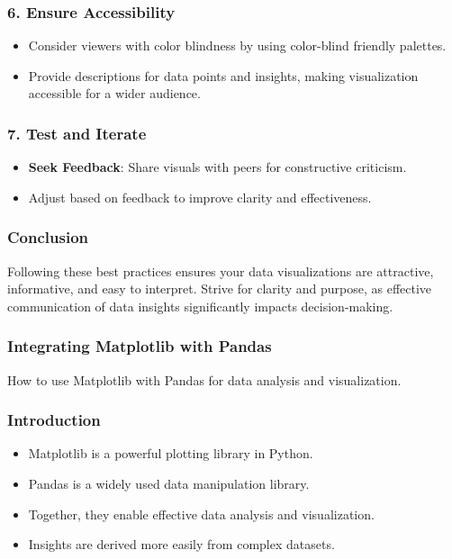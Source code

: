 \documentclass{beamer}
\begin{document}
\begin{frame}[fragile]
    \frametitle{6. Ensure Accessibility}
    \begin{itemize}
        \item Consider viewers with color blindness by using color-blind friendly palettes.
        \item Provide descriptions for data points and insights, making visualization accessible for a wider audience.
    \end{itemize}
\end{frame}

\begin{frame}[fragile]
    \frametitle{7. Test and Iterate}
    \begin{itemize}
        \item \textbf{Seek Feedback}: Share visuals with peers for constructive criticism.
        \item Adjust based on feedback to improve clarity and effectiveness.
    \end{itemize}
\end{frame}

\begin{frame}[fragile]
    \frametitle{Conclusion}
    Following these best practices ensures your data visualizations are attractive, informative, and easy to interpret. Strive for clarity and purpose, as effective communication of data insights significantly impacts decision-making.
\end{frame}

\begin{frame}
    \frametitle{Integrating Matplotlib with Pandas}
    How to use Matplotlib with Pandas for data analysis and visualization.
\end{frame}

\begin{frame}
    \frametitle{Introduction}
    \begin{itemize}
        \item Matplotlib is a powerful plotting library in Python.
        \item Pandas is a widely used data manipulation library.
        \item Together, they enable effective data analysis and visualization.
        \item Insights are derived more easily from complex datasets.
    \end{itemize}
\end{frame}
\end{document}
